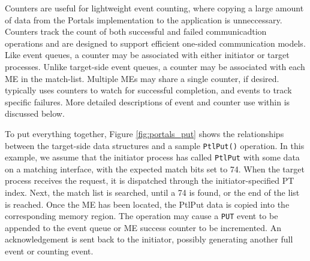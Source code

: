 Counters are useful for lightweight event counting, where copying a
large amount of data from the Portals implementation to the
application is unneccessary. Counters track the count of both
successful and failed communicadtion operations and are designed to
support efficient one-sided communication models. Like event queues, a
counter may be associated with either initiator or target
processes. Unlike target-side event queues, a counter may be
associated with each ME in the match-list. Multiple MEs may share a
single counter, if desired. \pdht typically uses counters to watch for
successful completion, and events to track specific failures. More
detailed descriptions of event and counter use within \pdht is
discussed below.

To put everything together, Figure \ref{fig:portals_put} shows the
relationships between the target-side data structures and a sample
{\tt PtlPut()} operation. In this example, we assume that the
initiator process has called {\tt PtlPut} with some data on a matching
interface, with the expected match bits set to 74. When the target
process receives the request, it is dispatched through the
initiator-specified PT index. Next, the match list is searched, until
a 74 is found, or the end of the list is reached. Once the ME has been
located, the PtlPut data is copied into the corresponding memory
region. The operation may cause a {\tt PUT} event to be appended to
the event queue or ME success counter to be incremented. An
acknowledgement is sent back to the initiator, possibly generating
another full event or counting event.




